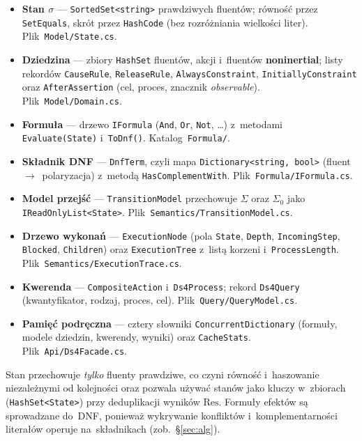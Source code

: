 \documentclass[11pt,a4paper]{article}
\newcommand{\Res}{\mathrm{Res}}
\begin{document}
\begin{itemize}\setlength\itemsep{0.35em}
  \item \textbf{Stan $\sigma$} --- \texttt{SortedSet<string>} prawdziwych
    fluentów; równość przez \texttt{SetEquals}, skrót przez \texttt{HashCode}
    (bez rozróżniania wielkości liter). Plik~\texttt{Model/State.cs}.
  \item \textbf{Dziedzina} --- zbiory \texttt{HashSet} fluentów, akcji
    i~fluentów \textbf{noninertial}; listy rekordów \texttt{CauseRule},
    \texttt{ReleaseRule}, \texttt{AlwaysConstraint}, \texttt{InitiallyConstraint}
    oraz \texttt{AfterAssertion} (cel, proces, znacznik \textit{observable}).
    Plik~\texttt{Model/Domain.cs}.
  \item \textbf{Formuła} --- drzewo \texttt{IFormula} (\texttt{And},
    \texttt{Or}, \texttt{Not}, \dots) z~metodami \texttt{Evaluate(State)}
    i~\texttt{ToDnf()}. Katalog~\texttt{Formula/}.
  \item \textbf{Składnik DNF} --- \texttt{DnfTerm}, czyli mapa
    \texttt{Dictionary<string,\,bool>} (fluent~$\to$~polaryzacja) z~metodą
    \texttt{HasComplementWith}. Plik~\texttt{Formula/IFormula.cs}.
  \item \textbf{Model przejść} --- \texttt{TransitionModel} przechowuje $\Sigma$
    oraz $\Sigma_0$ jako \texttt{IReadOnlyList<State>}.
    Plik~\texttt{Semantics/TransitionModel.cs}.
  \item \textbf{Drzewo wykonań} --- \texttt{ExecutionNode} (pola \texttt{State},
    \texttt{Depth}, \texttt{IncomingStep}, \texttt{Blocked}, \texttt{Children})
    oraz \texttt{ExecutionTree} z~listą korzeni i~\texttt{ProcessLength}.
    Plik~\texttt{Semantics/ExecutionTrace.cs}.
  \item \textbf{Kwerenda} --- \texttt{CompositeAction} i~\texttt{Ds4Process};
    rekord \texttt{Ds4Query} (kwantyfikator, rodzaj, proces, cel).
    Plik~\texttt{Query/QueryModel.cs}.
  \item \textbf{Pamięć podręczna} --- cztery słowniki
    \texttt{ConcurrentDictionary} (formuły, modele dziedzin, kwerendy, wyniki)
    oraz \texttt{CacheStats}. Plik~\texttt{Api/Ds4Facade.cs}.
\end{itemize}

Stan przechowuje \emph{tylko} fluenty prawdziwe, co czyni równość i~haszowanie
niezależnymi od kolejności oraz pozwala używać stanów jako kluczy w~zbiorach
(\texttt{HashSet<State>}) przy deduplikacji wyników $\Res$. Formuły efektów są
sprowadzane do~DNF, ponieważ wykrywanie konfliktów i~komplementarności literałów
operuje na~składnikach (zob.~\S\ref{sec:alg}).
\end{document}
